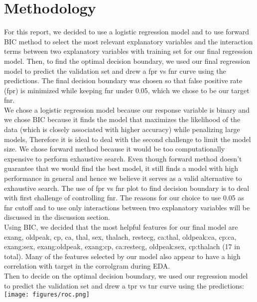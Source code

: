 \documentclass{article}
\begin{document}
\section{Methodology}
For this report, we decided to use a logistic regression model and
to use forward BIC method to select the most relevant explanatory variables
and the interaction terms between two explanatory variables
with training set for our final regression model.
Then, to find the optimal decision boundary,
we used our final regression model to predict the validation set
and drew a fpr vs fnr curve using the predictions.
The final decision boundary was chosen
so that false positive rate (fpr) is minimized while keeping fnr under 0.05,
which we chose to be our target fnr.\\

We chose a logistic regression model because our response variable is binary
and we chose BIC because it finds the model that maximizes the likelihood
of the data (which is closely associated with higher accuracy)
while penalizing large models, Therefore it is ideal
to deal with the second challenge to limit the model size.
We chose forward method because it would be too computationally expensive
to perform exhaustive search. Even though forward method doesn't guarantee that
we would find the best model, it still finds a model with high performance
in general and hence we believe it serves as a valid alternative to exhaustive search.
The use of fpr vs fnr plot to find decision boundary is
to deal with first challenge of controlling fnr. The reasons for our choice
to use 0.05 as fnr cutoff and to use only interactions
between two explanatory variables will be discussed in the discussion section.\\

Using BIC, we decided that the most helpful features for our final model are
exang, oldpeak, cp, ca, thal, sex, thalach, restecg, ca:thal, oldpeak:ca, cp:ca,
exang:sex, exang:oldpeak, exang:cp, ca:restecg, oldpeak:sex, cp:thalach (17 in total).
Many of the features selected by our model also appear to have a high correlation
with target in the corrolgram during EDA.\\


Then to decide on the optimal decision boundary, we used our regression model
to predict the validation set and drew a tpr vs tnr curve using the predictions:\\

\texttt{[image: figures/roc.png]}\\
\end{document}
